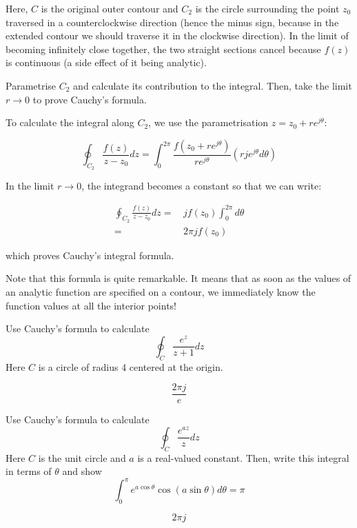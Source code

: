 \noindent{}Here, ${C}$ is the original outer contour and ${C}_2$ is the circle surrounding the point $z_0$ traversed in a counterclockwise direction (hence the minus sign, because in the extended contour we should traverse it in the clockwise direction). In the limit of becoming infinitely close together, the two straight sections cancel because $f(z)$ is continuous (a side effect of it being analytic).

\begin{cue}
Parametrise ${C}_2$ and calculate its contribution to the integral. Then, take the limit $ r \to 0 $ to prove Cauchy's formula.   
\end{cue}

To calculate the integral along ${C}_2$, we use the parametrisation $z=z_0 + r e^{j\theta}$:

\begin{equation}
\oint_{{C}_2} \frac{f(z)} {z-z_0} dz = \int_0^{2\pi} \frac{f(z_0
+ r e^{j\theta})} {r e^{j\theta}} \left(rje^{j \theta} d \theta\right)
\end{equation}

\noindent{}In the limit $ r \to 0 $, the integrand becomes a constant so that we can write:

\begin{align}
\oint_{{C}_2} \frac{f(z)} {z-z_0} dz = & \, j f(z_0)  \int_0^{2\pi} d \theta \nonumber \\
 = & \, 2 \pi j f(z_0)
\end{align}
 
which proves Cauchy's integral formula.

Note that this formula is quite remarkable. It means that as soon as the values of an analytic function are specified on a contour, we immediately know the function values at all the interior points!


\begin{exer}
Use Cauchy's formula to calculate 
$$\oint_{{C}}  \frac {e^z} {z+1} dz$$
Here ${C}$ is a circle of radius 4 centered at the origin.
\begin{sol}
$$\frac{2 \pi j}{e}$$
\end{sol}
\end{exer}

\begin{exer}
Use Cauchy's formula to calculate 
$$\oint_{{C}}  \frac {e^{az}} {z} dz$$
Here ${C}$ is the unit circle and $a$ is a real-valued constant. Then, write this integral in terms of $\theta$ and show
$$ \int_0^\pi e ^{a \cos \theta} \cos (a \sin \theta) d\theta = \pi $$
\begin{sol}
$$2 \pi j$$
\end{sol}
\end{exer}

